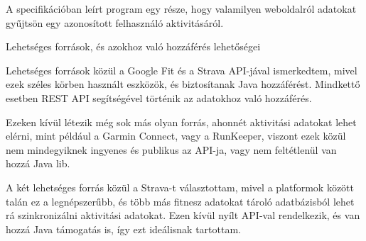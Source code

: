 A specifikációban leírt program egy része, hogy valamilyen weboldalról adatokat gyűjtsön egy azonosított felhasználó aktivitásáról. 

Lehetséges források, és azokhoz való hozzáférés lehetőségei 

Lehetséges források közül a Google Fit és a Strava API-jával ismerkedtem, mivel ezek széles körben használt eszközök, és biztosítanak Java hozzáférést. Mindkettő esetben REST API segítségével történik az adatokhoz való hozzáférés. 

Ezeken kívül létezik még sok más olyan forrás, ahonnét aktivitási adatokat lehet elérni, mint például a Garmin Connect, vagy a RunKeeper, viszont ezek közül nem mindegyiknek ingyenes és publikus az API-ja, vagy nem feltétlenül van hozzá Java lib. 

A két lehetséges forrás közül a Strava-t választottam, mivel a platformok között talán ez a legnépszerűbb, és több más fitnesz adatokat tároló adatbázisból lehet rá szinkronizálni aktivitási adatokat. Ezen kívül nyílt API-val rendelkezik, és van hozzá Java támogatás is, így ezt ideálisnak tartottam. 